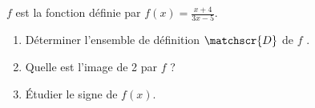 
$f$ est la fonction définie par $f(x)= \frac{x+4}{3x -5}$.
\begin{enumerate}
\item Déterminer l'ensemble de définition $\matchscr{D}$ de $f$ .
\item Quelle est l'image de 2 par $f$ ?
\item Étudier le signe de $f (x )$.
\end{enumerate}